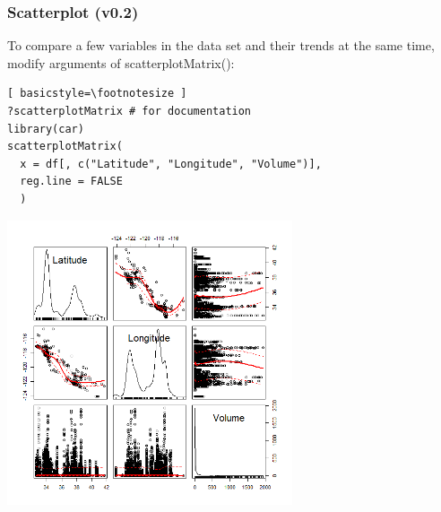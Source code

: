 \begin{frame}
\frametitle{Scatterplot (v0.2)}

To compare a few variables in the data set and their trends at the same time, modify arguments of \ttfamily scatterplotMatrix(): \normalfont
  		\begin{lstlisting}[ basicstyle=\footnotesize ]
?scatterplotMatrix # for documentation
library(car)		
scatterplotMatrix(
  x = df[, c("Latitude", "Longitude", "Volume")], 
  reg.line = FALSE
  )
		\end{lstlisting}

        \begin{center}
         \includegraphics[width=0.63\textwidth]{images/scatterPlot_v1.png}
        \end{center}
\end{frame}

